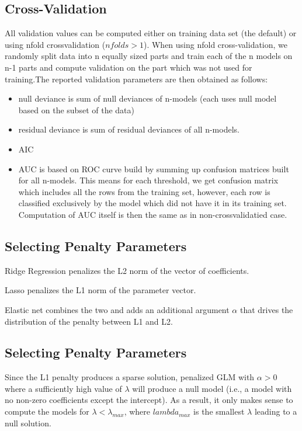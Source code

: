 \documentclass[11pt]{article}
\begin{document}
\subsection{Cross-Validation}
All validation values can be computed either on training data set (the default) or using nfold crossvalidation ($nfolds > 1$). When using nfold cross-validation, we randomly split data into n equally sized parts and train each of the n models on n-1 parts and compute validation on the part which was not used for training.The reported validation parameters are then obtained as follows:
\begin{itemize} 
\item null deviance is sum of null deviances of n-models (each uses null model based on the subset of the data)
\item residual deviance is sum of residual deviances of all n-models.
\item AIC
\item AUC is based on ROC curve build  by summing up confusion matrices built for all n-models.
This means for each threshold, we get confusion matrix which includes all the rows from
the training set, however, each row is classified exclusively by the model
which did not have it in its training set. Computation of AUC itself is then the same as in non-crossvalidatied case. 
\end{itemize}

\subsection{Selecting Penalty Parameters}

Ridge Regression penalizes the L2 norm of the vector of coefficients. 

Lasso penalizes the L1 norm of the parameter vector.

Elastic net combines the two and adds an additional argument $\alpha$ that drives the distribution of the penalty between L1 and L2.

\subsection{Selecting Penalty Parameters}

Since the L1 penalty produces a sparse solution, penalized GLM with  $\alpha > 0$ where a sufficiently high value of $\lambda$ will produce a null model (i.e., a model with no non-zero coefficients except the intercept). As a result, it only makes sense to compute the models for $\lambda < \lambda_{max}$, where $lambda_{max}$ is the smallest $\lambda$ leading to a null solution.
\end{document}
